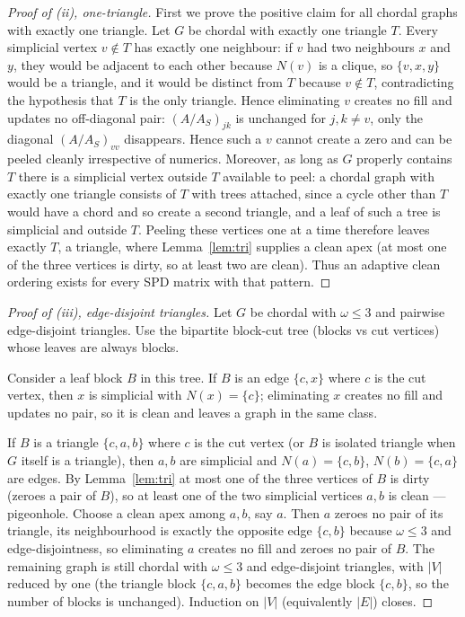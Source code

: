 \documentclass[11pt]{article}
\theoremstyle{plain}
\theoremstyle{definition}
\theoremstyle{remark}
\begin{document}
\begin{aiblock}
\begin{proof}[Proof of (ii), one-triangle]
First we prove the positive claim for all chordal graphs with exactly one triangle. Let $G$ be chordal with exactly one triangle $T$. Every simplicial vertex $v\notin T$ has exactly one neighbour: if $v$ had two neighbours $x$ and
$y$, they would be adjacent to each other because $N(v)$ is a clique, so $\{v,x,y\}$ would be a
triangle, and it would be distinct from $T$ because $v\notin T$, contradicting the hypothesis that
$T$ is the only triangle. Hence eliminating $v$ creates no fill and updates no off-diagonal pair: $(A/A_S)_{jk}$ is unchanged for $j,k\neq v$, only the diagonal $(A/A_S)_{vv}$ disappears. Hence such a $v$ cannot create a zero and can be peeled cleanly irrespective of numerics. Moreover, as long as $G$ properly contains $T$ there is a simplicial vertex outside $T$ available
to peel: a chordal graph with exactly one triangle consists of $T$ with trees attached, since a cycle
other than $T$ would have a chord and so create a second triangle, and a leaf of such a tree is
simplicial and outside $T$. Peeling these vertices one at a time therefore leaves exactly $T$, a
triangle, where Lemma~\ref{lem:tri} supplies a clean apex (at most one of the three vertices is dirty, so at least two are clean). Thus an adaptive clean ordering exists for every SPD matrix with that pattern.

\end{proof}

\begin{proof}[Proof of (iii), edge-disjoint triangles]
Let $G$ be chordal with $\omega\le3$ and pairwise edge-disjoint triangles. Use the bipartite block-cut tree (blocks vs cut vertices) whose leaves are always blocks.

Consider a leaf block $B$ in this tree. If $B$ is an edge $\{c,x\}$ where $c$ is the cut vertex, then $x$ is simplicial with $N(x)=\{c\}$; eliminating $x$ creates no fill and updates no pair, so it is clean and leaves a graph in the same class.

If $B$ is a triangle $\{c,a,b\}$ where $c$ is the cut vertex (or $B$ is isolated triangle when $G$ itself is a triangle), then $a,b$ are simplicial and $N(a)=\{c,b\}$, $N(b)=\{c,a\}$ are edges. By Lemma~\ref{lem:tri} at most one of the three vertices of $B$ is dirty (zeroes a pair of $B$), so at least one of the two simplicial vertices $a,b$ is clean — pigeonhole. Choose a clean apex among $a,b$, say $a$. Then $a$ zeroes no pair of its triangle, its neighbourhood is exactly the opposite edge $\{c,b\}$ because $\omega\le3$ and edge-disjointness, so eliminating $a$ creates no fill and zeroes no pair of $B$. The remaining graph is still chordal with $\omega\le3$ and edge-disjoint triangles, with $|V|$ reduced by one (the triangle block $\{c,a,b\}$ becomes the edge block $\{c,b\}$, so the number of blocks is unchanged). Induction on $|V|$ (equivalently $|E|$) closes.
\end{proof}
\end{aiblock}
\end{document}
